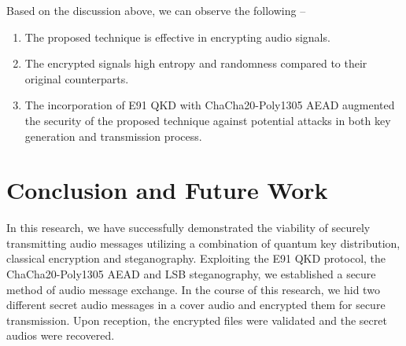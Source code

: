 \documentclass{article}
\begin{document}
Based on the discussion above, we can observe the following --
\begin{enumerate}
    \item The proposed technique is effective in encrypting audio signals.
    \item The encrypted signals high entropy and randomness compared to their original counterparts.
    \item The incorporation of E91 QKD with ChaCha20-Poly1305 AEAD augmented the security of the proposed technique against potential attacks in both key generation and transmission process.
\end{enumerate}
\section{Conclusion and Future Work}
\label{sec:conclusion}
In this research, we have successfully demonstrated the viability of securely transmitting audio messages utilizing a combination of quantum key distribution, classical encryption and steganography. Exploiting the E91 QKD protocol, the ChaCha20-Poly1305 AEAD and LSB steganography, we established a secure method of audio message exchange. In the course of this research, we hid two different secret audio messages in a cover audio and encrypted them for secure transmission. Upon reception, the encrypted files were validated and the secret audios were recovered.


\end{document}
